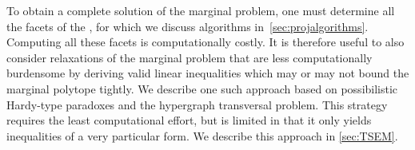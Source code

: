 {%

To obtain a complete solution of the marginal problem, one must determine all the facets of the , for which we discuss algorithms in~\cref{sec:projalgorithms}.
Computing all these facets is computationally costly.  It is therefore useful to also consider relaxations of the marginal problem that are less computationally burdensome by deriving valid linear inequalities which may or may not bound the marginal polytope tightly.
We describe one such approach based on possibilistic Hardy-type paradoxes and the hypergraph transversal problem. This strategy requires the least computational effort, but is limited in that it only yields inequalities of a very particular form.  We describe this approach in \cref{sec:TSEM}.


}
